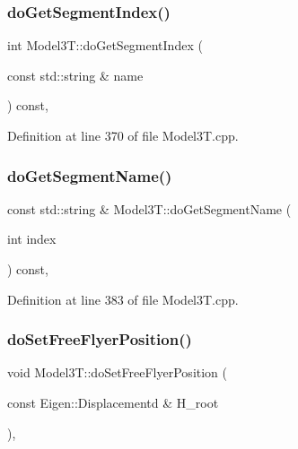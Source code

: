 \subsubsection{\texorpdfstring{do\+Get\+Segment\+Index()}{doGetSegmentIndex()}}
{\footnotesize\ttfamily int Model3\+T\+::do\+Get\+Segment\+Index (\begin{DoxyParamCaption}\item[{const std\+::string \&}]{name }\end{DoxyParamCaption}) const\hspace{0.3cm}{\ttfamily [protected]}, {\ttfamily [virtual]}}



Definition at line 370 of file Model3\+T.\+cpp.

\hypertarget{classModel3T_a1fbf30cc6c5a4abfcd9ecd574e79b866}{}\label{classModel3T_a1fbf30cc6c5a4abfcd9ecd574e79b866} 
\subsubsection{\texorpdfstring{do\+Get\+Segment\+Name()}{doGetSegmentName()}}
{\footnotesize\ttfamily const std\+::string \& Model3\+T\+::do\+Get\+Segment\+Name (\begin{DoxyParamCaption}\item[{int}]{index }\end{DoxyParamCaption}) const\hspace{0.3cm}{\ttfamily [protected]}, {\ttfamily [virtual]}}



Definition at line 383 of file Model3\+T.\+cpp.

\hypertarget{classModel3T_ab239abd9e83130d463503eb5915e2ed1}{}\label{classModel3T_ab239abd9e83130d463503eb5915e2ed1} 
\subsubsection{\texorpdfstring{do\+Set\+Free\+Flyer\+Position()}{doSetFreeFlyerPosition()}}
{\footnotesize\ttfamily void Model3\+T\+::do\+Set\+Free\+Flyer\+Position (\begin{DoxyParamCaption}\item[{const Eigen\+::\+Displacementd \&}]{H\+\_\+root }\end{DoxyParamCaption})\hspace{0.3cm}{\ttfamily [protected]}, {\ttfamily [virtual]}}



